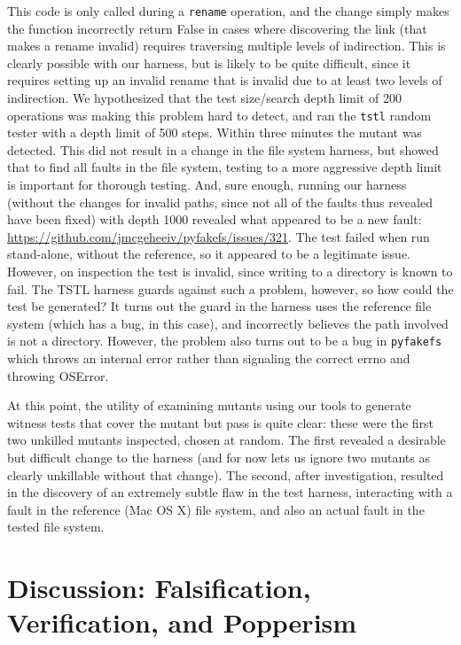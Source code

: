 \documentclass{svjour3}
\begin{document}
This code is only called during a {\tt rename} operation, and the change simply makes
the function incorrectly return False in cases where discovering the
link (that makes a rename invalid) requires traversing multiple levels
of indirection.  This is clearly possible with our harness, but is
likely to be quite difficult, since it requires setting up an invalid
rename that is invalid due to at least two levels of indirection.  We
hypothesized that the test size/search depth limit of 200 operations was making
this problem hard to detect, and ran the {\tt tstl} random tester with
a depth limit of 500 steps.  Within three minutes the mutant was
detected. This did not result in a change in the file system harness,
but showed that to find all faults in the file system, testing to a
more aggressive depth limit is important for thorough testing.  And,
sure enough, running our harness (without the changes for invalid
paths, since not all of the faults thus revealed have been fixed) with
depth 1000 revealed what appeared to be a new fault:  
\url{https://github.com/jmcgeheeiv/pyfakefs/issues/321}.  The test
failed when run stand-alone, without the reference, so it appeared to
be a legitimate issue.  However, on inspection the test is invalid,
since writing to a directory is known to fail.  The TSTL harness
guards against such a problem, however, so how could the test be
generated?  It turns out the guard in the harness uses the reference
file system (which has a bug, in this case), and incorrectly believes
the path involved is not a directory.  However, the problem also turns
out to be a bug in {\tt pyfakefs} which throws an internal error
rather than signaling the correct errno and throwing OSError.

At this point, the utility of examining mutants using our tools to
generate witness tests that cover the mutant but pass is quite clear:
these were the first two unkilled mutants inspected, chosen at
random.  The first revealed a desirable but difficult change to the
harness (and for now lets us ignore two mutants as clearly unkillable
without that change).  The second, after investigation, resulted in
the discovery of an extremely subtle flaw in the test harness,
interacting with a fault in the reference (Mac OS X) file system, and
also an actual fault in the tested file system.

\section{Discussion:  Falsification, Verification, and Popperism}
\end{document}
